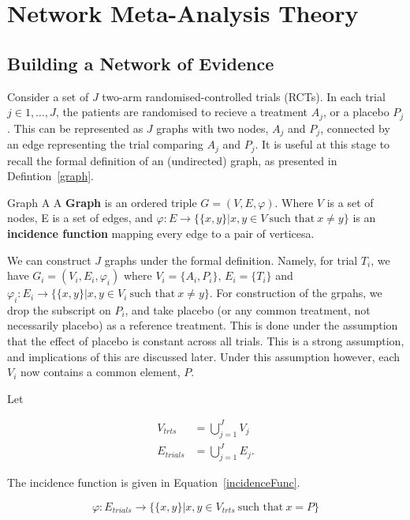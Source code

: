 \chapter{Network Meta-Analysis Theory}\label{nmatheory}

\section{Building a Network of Evidence}

Consider a set of $J$ two-arm randomised-controlled trials (RCTs). In each trial $j \in 1,\ldots,J$, the patients are randomised to recieve a treatment $A_j$, or a placebo $P_j$. This can be represented as $J$ graphs with two nodes, $A_j$ and $P_j$, connected by an edge representing the trial comparing $A_j$ and $P_j$. It is useful at this stage to recall the formal definition of an (undirected) graph, as presented in Defintion~\ref{graph}. 

\begin{definition}[label=graph]{Graph}
A  A \textbf{Graph} is an ordered triple $G = (V, E, \varphi)$. Where  $V$ is a set of nodes, E is a set  of edges, and $\varphi : E \to \{\{ x, y \} | x, y \in V \ \text{such that} \ x \neq y \}$ is an  \textbf{incidence function} mapping every edge to a pair of verticesa.
\end{definition}

We can construct $J$ graphs under the formal definition. Namely, for trial $T_i$, we have $G_i = (V_i, E_i, \varphi_i)$ where $V_i = \{ A_i, P_i \}$, $E_i = \{T_i\}$ and $\varphi_i : E_i \to \{ \{ x, y \} | x, y \in V_i \ \text{such that} \  x \neq y \}$. For construction of the grpahs, we drop the subscript on $P_i$, and take placebo (or any common treatment, not necessarily placebo) as a reference treatment. This is done under the assumption that the effect of placebo is constant across all trials. This is a strong assumption, and implications of this are discussed later. Under this assumption however, each $V_i$ now contains a common element, $P$.

Let

\begin{align}
    V_{trts} &= \bigcup_{j=1}^{J} V_j \\
    E_{trials} &= \bigcup_{j=1}^{J} E_j
.\end{align}

The incidence function is given in Equation~\ref{incidenceFunc}.

\begin{equation}
    \varphi : E_{trials} \to \{ \{x, y \} | x, y \in V_{trts} \ \text{such that} \ x = P \}
    \label{incidenceFunc}
\end{equation}

